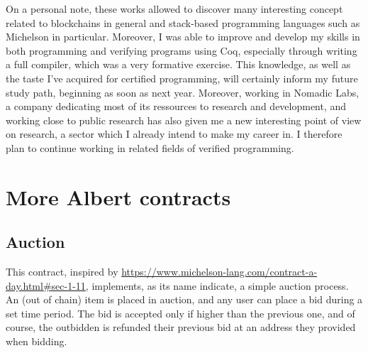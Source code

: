 \documentclass{report}
\begin{document}
On a personal note, these works allowed to discover many interesting concept related to blockchains in general and stack-based programming languages such as Michelson in particular. Moreover, I was able to improve and develop my skills in both programming and verifying programs using Coq, especially through writing a full compiler, which was a very formative exercise. This knowledge, as well as the taste I've acquired for certified programming, will certainly inform my future study path, beginning as soon as next year. Moreover, working in Nomadic Labs, a company dedicating most of its ressources to research and development, and working close to public research has also given me a new interesting point of view on research, a sector which I already intend to make my career in. I therefore plan to continue working in related fields of verified programming.

\appendix

\chapter{More Albert contracts}
\label{appendix:moreAlbert}

\section{Auction}

This contract, inspired by \url{https://www.michelson-lang.com/contract-a-day.html#sec-1-11}, implements, as its name indicate, a simple auction process. An (out of chain) item is placed in auction, and any user can place a bid during a set time period. The bid is accepted only if higher than the previous one, and of course, the outbidden is refunded their previous bid at an address they provided when bidding.
\end{document}

